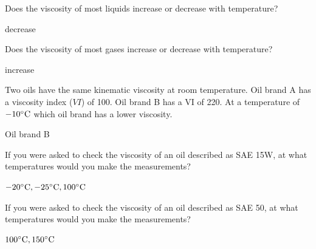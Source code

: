\documentclass[12pt]{article}
\begin{document}
\begin{question}

Does the viscosity of most liquids increase or decrease with temperature?

\begin{solution}
decrease
\end{solution}

\end{question}

\begin{question}

Does the viscosity of most gases increase or decrease with temperature?

\begin{solution}
increase
\end{solution}

\end{question}

\begin{question}

Two oils have the same kinematic viscosity at room temperature.  Oil brand A has a viscosity index ($VI$) of 100.  Oil brand B has a VI of 220.  At a temperature of $-10^\circ {\rm C}$ which oil brand has a lower viscosity.

\begin{solution}
Oil brand B
\end{solution}

\end{question}

\begin{question}

If you were asked to check the viscosity of an oil described as SAE 15W, at what temperatures would you make the measurements?

\begin{solution}
 $-20^\circ {\rm C}, -25^\circ {\rm C}, 100^\circ {\rm C}$
\end{solution}

\end{question}

\begin{question}

If you were asked to check the viscosity of an oil described as SAE 50, at what temperatures would you make the measurements?

\begin{solution}
$100^\circ {\rm C},  150^\circ {\rm C}$
\end{solution}

\end{question}
\end{document}
